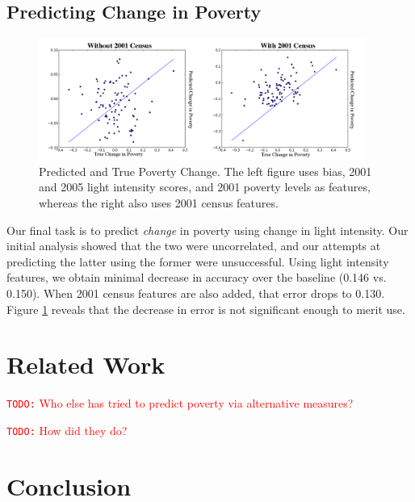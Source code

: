 \documentclass[10pt, letterpaper]{article}
\theoremstyle{plain}
\theoremstyle{definition}
\newcommand{\todo}[1]{
	\textcolor{red}{\texttt{TODO:} #1}
}
\begin{document}
\subsection{Predicting Change in Poverty}

\begin{figure}
  \centering
  \includegraphics[width=0.95\textwidth]{figures/dpoverty-predictions}
  \caption{Predicted and True Poverty Change.  The left figure uses bias, 2001 and 2005 light intensity scores, and 2001 poverty levels as features, whereas the right also uses 2001 census features.}
  \label{fig:dpoverty-predictions}
\end{figure}

  Our final task is to predict \textit{change} in poverty using change in light intensity. Our initial analysis showed that the two were uncorrelated, and our attempts at predicting the latter using the former were unsuccessful.  Using light intensity features, we obtain minimal decrease in accuracy over the baseline (0.146 vs. 0.150). When 2001 census features are also added, that error drops to 0.130.  Figure \ref{fig:dpoverty-predictions} reveals that the decrease in error is not significant enough to merit use.

\section{Related Work}

\todo{Who else has tried to predict poverty via alternative measures?}

\todo{How did they do?}

\section{Conclusion}
\end{document}
